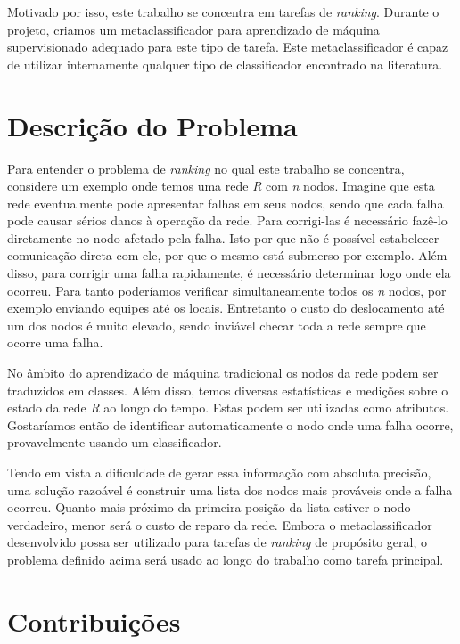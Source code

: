 Motivado por isso, este trabalho se concentra em tarefas de \textit{ranking}.
Durante o projeto, criamos um metaclassificador para aprendizado de máquina supervisionado adequado para este tipo de tarefa.
Este metaclassificador é capaz de utilizar internamente qualquer tipo de classificador encontrado na literatura.

\section{Descrição do Problema}

Para entender o problema de \textit{ranking} no qual este trabalho se concentra, considere um exemplo onde temos uma rede \textit{R} com \textit{n} nodos.
Imagine que esta rede eventualmente pode apresentar falhas em seus nodos, sendo que cada falha pode causar sérios danos à operação da rede.
Para corrigi-las é necessário fazê-lo diretamente no nodo afetado pela falha.
Isto por que não é possível estabelecer comunicação direta com ele, por que o mesmo está submerso por exemplo.
Além disso, para corrigir uma falha rapidamente, é necessário determinar logo onde ela ocorreu.
Para tanto poderíamos verificar simultaneamente todos os \textit{n} nodos, por exemplo enviando equipes até os locais.
Entretanto o custo do deslocamento até um dos nodos é muito elevado, sendo inviável checar toda a rede sempre que ocorre uma falha.

No âmbito do aprendizado de máquina tradicional os nodos da rede podem ser traduzidos em classes.
Além disso, temos diversas estatísticas e medições sobre o estado da rede \textit{R} ao longo do tempo.
Estas podem ser utilizadas como atributos.
Gostaríamos então de identificar automaticamente o nodo onde uma falha ocorre, provavelmente usando um classificador.

Tendo em vista a dificuldade de gerar essa informação com absoluta precisão, uma solução razoável é construir uma lista dos nodos mais prováveis onde a falha ocorreu.
Quanto mais próximo da primeira posição da lista estiver o nodo verdadeiro, menor será o custo de reparo da rede.
Embora o metaclassificador desenvolvido possa ser utilizado para tarefas de \textit{ranking} de propósito geral, o problema definido acima será usado ao longo do trabalho como tarefa principal.

\newpage
\section{Contribuições}


